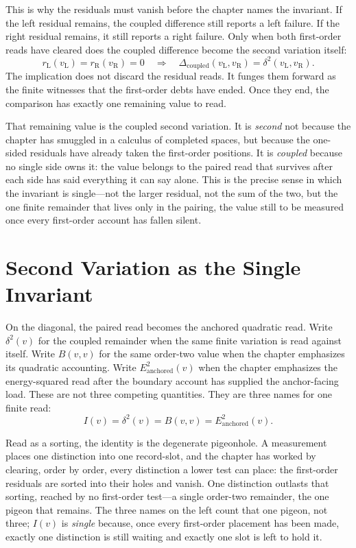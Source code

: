This is why the residuals must vanish before the chapter names the invariant.
If the left residual remains, the coupled difference still reports a left
failure. If the right residual remains, it still reports a right failure. Only
when both first-order reads have cleared does the coupled difference become the
second variation itself:
\[
  r_{\mathrm{L}}(v_{\mathrm{L}})
  =
  r_{\mathrm{R}}(v_{\mathrm{R}})
  =
  0
  \quad\Longrightarrow\quad
  \Delta_{\mathrm{coupled}}(v_{\mathrm{L}},v_{\mathrm{R}})
    =
  \delta^2(v_{\mathrm{L}},v_{\mathrm{R}}).
\]
The implication does not discard the residual reads. It funges them forward as
the finite witnesses that the first-order debts have ended. Once they end, the
comparison has exactly one remaining value to read.

That remaining value is the coupled second variation. It is \emph{second} not
because the chapter has smuggled in a calculus of completed spaces, but because
the one-sided residuals have already taken the first-order positions. It is
\emph{coupled} because no single side owns it: the value belongs to the paired
read that survives after each side has said everything it can say alone. This is
the precise sense in which the invariant is single---not the larger residual,
not the sum of the two, but the one finite remainder that lives only in the
pairing, the value still to be measured once every first-order account has
fallen silent.

\section{Second Variation as the Single Invariant}

On the diagonal, the paired read becomes the anchored quadratic read. Write
\(\delta^2(v)\) for the coupled remainder when the same finite variation is
read against itself. Write \(B(v,v)\) for the same order-two value when the
chapter emphasizes its quadratic accounting. Write
\(E^2_{\mathrm{anchored}}(v)\) when the chapter emphasizes the energy-squared
read after the boundary account has supplied the anchor-facing load. These are
not three competing quantities. They are three names for one finite read:
\[
  I(v)
    =
  \delta^2(v)
    =
  B(v,v)
    =
  E^2_{\mathrm{anchored}}(v).
\]

Read as a sorting, the identity is the degenerate pigeonhole. A measurement
places one distinction into one record-slot, and the chapter has worked by
clearing, order by order, every distinction a lower test can place: the
first-order residuals are sorted into their holes and vanish. One distinction
outlasts that sorting, reached by no first-order test---a single order-two
remainder, the one pigeon that remains. The three names on the left count that
one pigeon, not three; \(I(v)\) is \emph{single} because, once every
first-order placement has been made, exactly one distinction is still waiting
and exactly one slot is left to hold it.

